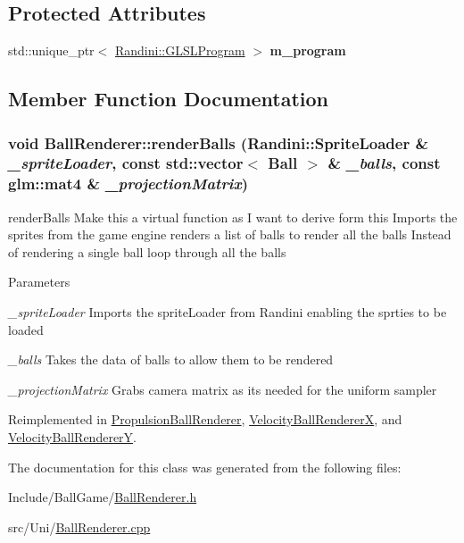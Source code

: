 \subsection*{Protected Attributes}
\begin{DoxyCompactItemize}
\item 
\hypertarget{classBallRenderer_a3e9fad7afb392a4be134536bbb4a209a}{
std::unique\_\-ptr$<$ \hyperlink{classRandini_1_1GLSLProgram}{Randini::GLSLProgram} $>$ {\bfseries m\_\-program}}
\label{classBallRenderer_a3e9fad7afb392a4be134536bbb4a209a}

\end{DoxyCompactItemize}


\subsection{Member Function Documentation}
\hypertarget{classBallRenderer_a11d6402983ed53ab7f3d3353244110da}{
\subsubsection[{renderBalls}]{\setlength{\rightskip}{0pt plus 5cm}void BallRenderer::renderBalls ({\bf Randini::SpriteLoader} \& {\em \_\-spriteLoader}, \/  const std::vector$<$ {\bf Ball} $>$ \& {\em \_\-balls}, \/  const glm::mat4 \& {\em \_\-projectionMatrix})}}
\label{classBallRenderer_a11d6402983ed53ab7f3d3353244110da}


renderBalls Make this a virtual function as I want to derive form this Imports the sprites from the game engine renders a list of balls to render all the balls Instead of rendering a single ball loop through all the balls 
\begin{DoxyParams}{Parameters}
\item[{\em \_\-spriteLoader}]Imports the spriteLoader from Randini enabling the sprties to be loaded \item[{\em \_\-balls}]Takes the data of balls to allow them to be rendered \item[{\em \_\-projectionMatrix}]Grabs camera matrix as its needed for the uniform sampler \end{DoxyParams}


Reimplemented in \hyperlink{classPropulsionBallRenderer_ad3206abdc61b39c3716eed6ed91acaa0}{PropulsionBallRenderer}, \hyperlink{classVelocityBallRendererX_a36057cc32c5310d711373697acaefec6}{VelocityBallRendererX}, and \hyperlink{classVelocityBallRendererY_ac519caa863fba74226b6733dbe033b59}{VelocityBallRendererY}.

The documentation for this class was generated from the following files:\begin{DoxyCompactItemize}
\item 
Include/BallGame/\hyperlink{BallRenderer_8h}{BallRenderer.h}\item 
src/Uni/\hyperlink{BallRenderer_8cpp}{BallRenderer.cpp}\end{DoxyCompactItemize}
